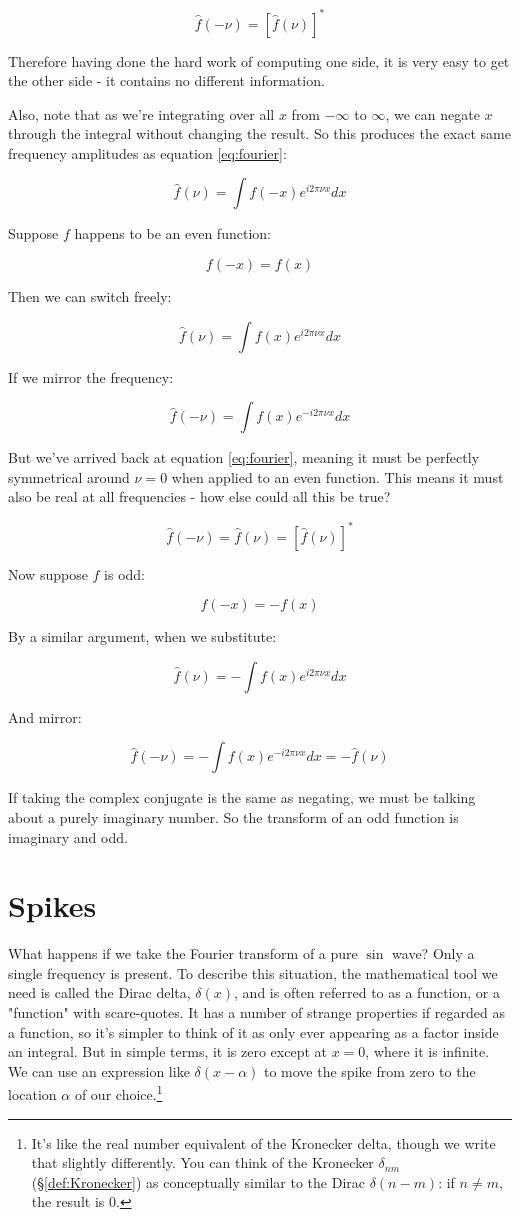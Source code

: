 $$
\hat{f}(-\nu) = \left[ \hat{f}(\nu) \right]^*
$$

Therefore having done the hard work of computing one side, it is very easy to get the other side - it contains no different information.

Also, note that as we're integrating over all $x$ from $-\infty$ to $\infty$, we can negate $x$ through the integral without changing the result. So this produces the exact same frequency amplitudes as equation \eqref{eq:fourier}:

$$\hat{f}(\nu) = \int f(-x)e^{i2\pi\nu x} dx$$

Suppose $f$ happens to be an even function:

$$f(-x) = f(x)$$

Then we can switch freely:

$$\hat{f}(\nu) = \int f(x)e^{i2\pi\nu x} dx$$

If we mirror the frequency:

$$\hat{f}(-\nu) = \int f(x)e^{-i2\pi\nu x} dx$$

But we've arrived back at equation \eqref{eq:fourier}, meaning it must be perfectly symmetrical around $\nu = 0$ when applied to an even function. This means it must also be real at all frequencies - how else could all this be true?

$$
\hat{f}(-\nu) = \hat{f}(\nu) = \left[ \hat{f}(\nu) \right]^*
$$

Now suppose $f$ is odd:

$$f(-x) = -f(x)$$

By a similar argument, when we substitute:

$$
\hat{f}(\nu) = - \int f(x)e^{i2\pi\nu x}
dx
$$

And mirror:

$$
\hat{f}(-\nu) = - \int f(x)e^{-i2\pi\nu x}
dx
= -\hat{f}(\nu)
$$

If taking the complex conjugate is the same as negating, we must be talking about a purely imaginary number. So the transform of an odd function is imaginary and odd.

\section{Spikes} \label{sec:fourier-spike}

What happens if we take the Fourier transform of a pure $\sin$ wave? Only a single frequency is present. To describe this situation, the mathematical tool we need is called the Dirac delta, $\delta(x)$, and is often referred to as a function, or a "function" with scare-quotes. It has a number of strange properties if regarded as a function, so it's simpler to think of it as only ever appearing as a factor inside an integral. But in simple terms, it is zero except at $x = 0$, where it is infinite. We can use an expression like $\delta(x - \alpha)$ to move the spike from zero to the location $\alpha$ of our choice.\footnote{It's like the real number equivalent of the Kronecker delta, though we write that slightly differently. You can think of the Kronecker $\delta_{nm}$ (§\ref{def:Kronecker}) as conceptually similar to the Dirac $\delta(n - m)$: if $n \ne m$, the result is $0$.}

